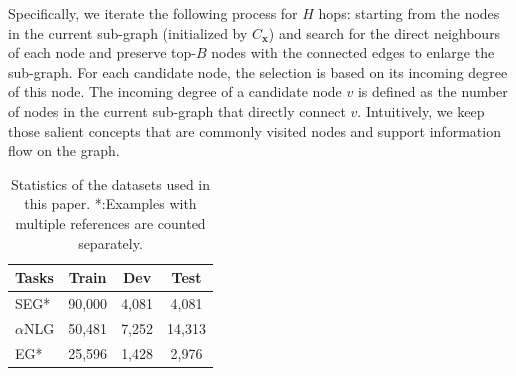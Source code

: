 \documentclass[11pt,a4paper]{article}
\begin{document}
Specifically, we iterate the following process for $H$ hops: starting from the nodes in the current sub-graph (initialized by $C_{\bm{x}}$) and search for the direct neighbours of each node and preserve top-$B$ nodes with the connected edges to enlarge the sub-graph. For each candidate node, the selection is based on its incoming degree of this node. The incoming degree of a candidate node $v$ is defined as the number of nodes in the current sub-graph that directly connect $v$. Intuitively, we keep those salient concepts that are commonly visited nodes and support information flow on the graph.






\begin{table}[t]
    \centering
    \small
    \begin{tabular}{lccc}
    
    \toprule[1.5pt]
    Tasks & Train & Dev & Test\\
    \midrule[1pt]
        SEG* & 90,000 & 4,081 & 4,081 \\
        $\alpha$NLG & 50,481 & 7,252 & 14,313 \\
        EG* & 25,596 & 1,428 & 2,976 \\
    \bottomrule[1.5pt]
    \end{tabular}
    \caption{Statistics of the datasets used in this paper. *:Examples with multiple references are counted separately.}
    \label{tab:stats}
\end{table}
\end{document}
